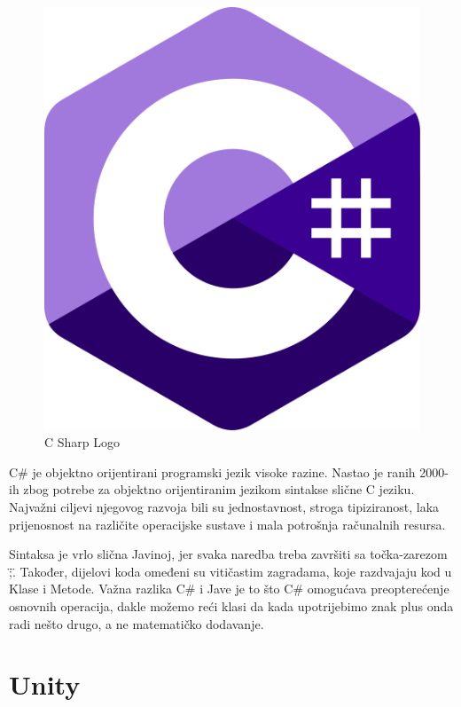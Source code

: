 \documentclass[diplomskirad]{fer}
\begin{document}
    \begin{figure}[H]
        \centering
        \includegraphics[scale=0.1]{images/c-sharp}
        \caption{
            C Sharp Logo \cite{cSharpLogo}
        }
        \label{fig:cSharpLogo}
    \end{figure}

    C\# je objektno orijentirani programski jezik visoke razine.
    Nastao je ranih 2000-ih zbog potrebe za objektno orijentiranim jezikom sintakse slične C jeziku.
    Najvažni ciljevi njegovog razvoja bili su jednostavnost, stroga tipiziranost,
    laka prijenosnost na različite operacijske sustave i mala potrošnja računalnih resursa.

    Sintaksa je vrlo slična Javinoj, jer svaka naredba treba završiti sa točka-zarezom \";\".
    Također, dijelovi koda omeđeni su vitičastim zagradama, koje razdvajaju kod u Klase i Metode.
    Važna razlika C\# i Jave je to što C\# omogućava preopterećenje osnovnih operacija, dakle možemo reći klasi da kada
    upotrijebimo znak plus onda radi nešto drugo, a ne matematičko dodavanje.


    \newpage
    \section{Unity}\label{sec:unity}
\end{document}
